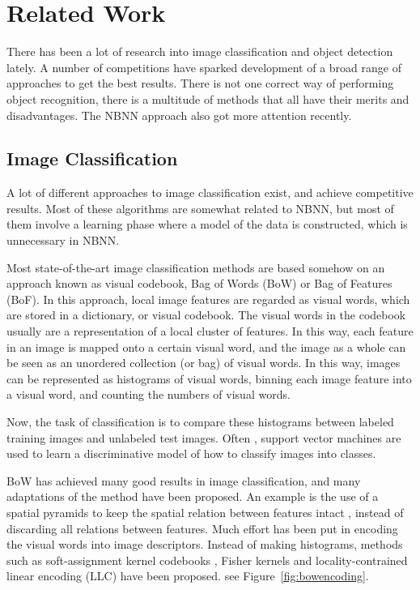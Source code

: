 \section{Related Work} %
\label{cha:related_work}
There has been a lot of research into image classification and object detection lately. A number of competitions have sparked development of a broad range of approaches to get the best results. There is not one correct way of performing object recognition, there is a multitude of methods that all have their merits and disadvantages. The NBNN approach also got more attention recently.

\subsection{Image Classification} %
\label{sec:image_classification}

A lot of different approaches to image classification exist, and achieve competitive results. Most of these algorithms are somewhat related to NBNN, but most of them involve a learning phase where a model of the data is constructed, which is unnecessary in NBNN.

Most state-of-the-art image classification methods are based somehow on an approach known as visual codebook, Bag of Words (BoW) or Bag of Features (BoF). \cite{chatfield2011devil, lazebnik2006beyond, liu2011defense, van2010visual, van2011exploiting, wang2010locality}  In this approach, local image features are regarded as visual words, which are stored in a dictionary, or visual codebook. The visual words in the codebook usually are a representation of a local cluster of features. In this way, each feature in an image is mapped onto a certain visual word, and the image as a whole can be seen as an unordered collection (or bag) of visual words. In this way, images can be represented as histograms of visual words, binning each image feature into a visual word, and counting the numbers of visual words.

Now, the task of classification is to compare these histograms between labeled training images and unlabeled test images. Often \cite{chatfield2011devil}, support vector machines are used to learn a discriminative model of how to classify images into classes.

BoW has achieved many good results in image classification, and many adaptations of the method have been proposed. An example is the use of a spatial pyramids to keep the spatial relation between features intact \cite{lazebnik2006beyond}, instead of discarding all relations between features. Much effort has been put in encoding the visual words into image descriptors. \cite{chatfield2011devil} Instead of making histograms, methods such as soft-assignment kernel codebooks \cite{liu2011defense, van2010visual}, Fisher kernels and locality-contrained linear encoding (LLC) \cite{wang2010locality} have been proposed. see Figure~\ref{fig:bowencoding}.

